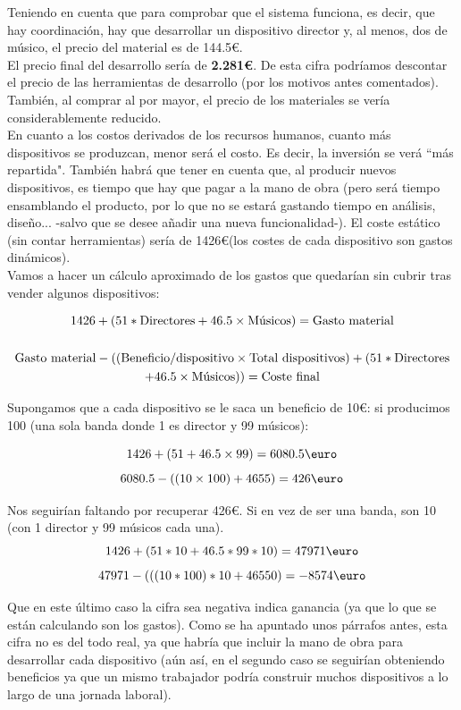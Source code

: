 Teniendo en cuenta que para comprobar que el sistema funciona, es decir, que hay
coordinación, hay que desarrollar un dispositivo director y,  al menos, dos de músico,
el precio del material es de 144.5\euro.\\

El precio final del desarrollo sería de \textbf{2.281\euro}. De esta cifra podríamos
descontar el precio de las herramientas de desarrollo (por los motivos antes comentados).
También, al comprar al por mayor, el precio de los materiales se vería considerablemente
reducido.\\

En cuanto a los costos derivados de los recursos humanos, cuanto más dispositivos se produzcan,
menor será el costo. Es decir, la inversión se verá ``más repartida". También habrá que tener en
cuenta que, al producir nuevos dispositivos, es tiempo que hay que pagar a la mano de obra
(pero será tiempo ensamblando el producto, por lo que no se estará gastando tiempo en análisis,
diseño... -salvo que se desee añadir una nueva funcionalidad-). El coste estático (sin contar herramientas)
sería de 1426\euro (los costes de cada dispositivo son gastos dinámicos).\\

Vamos a hacer un cálculo aproximado de los gastos que quedarían sin cubrir tras vender algunos dispositivos:

\begin{gather*}
  1426 + (51 * \textup{Directores} +46.5 \times \textup{Músicos}) = \textup{Gasto material} \\ \\
  \textup{Gasto material} - ((\textup{Beneficio/dispositivo} \times \textup{Total dispositivos})+(51 * \textup{Directores}\\
  + 46.5 \times \textup{Músicos})) = \textup{Coste final}
\end{gather*}

Supongamos que a cada dispositivo se le saca un beneficio de 10\euro: si producimos 100
(una sola banda donde 1 es director y 99 músicos):

\[
  1426 + (51+46.5 \times 99) = 6080.5  \textup{\euro}
\]
\[
  6080.5 - ((10 \times 100)+4655) = 426  \textup{\euro}
\]

Nos seguirían faltando por recuperar 426\euro. Si en vez de ser una banda, son 10
(con 1 director y 99 músicos cada una).\\


\[
  1426 + (51*10+46.5*99*10) = 47971  \textup{\euro}
\]
\[
  47971 - (((10*100)*10+46550) = -8574  \textup{\euro}
\]

Que en este último caso la cifra sea negativa indica ganancia (ya que lo que se están
calculando son los gastos). Como se ha apuntado unos párrafos antes, esta cifra no es
del todo real, ya que habría que incluir la mano de obra para desarrollar cada dispositivo
(aún así, en el segundo caso se seguirían obteniendo beneficios ya que un mismo trabajador
podría construir muchos dispositivos a lo largo de una jornada laboral).\\
